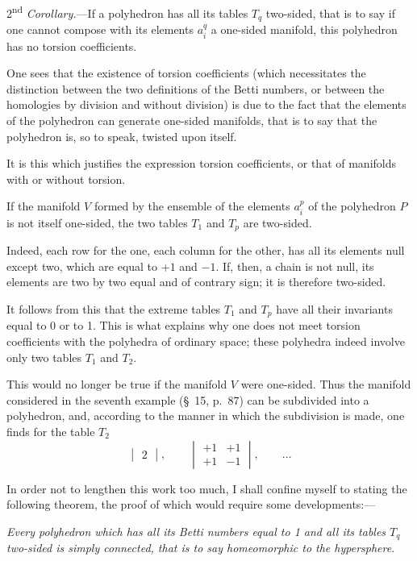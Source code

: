 \documentclass{article}
\begin{document}
2\textsuperscript{nd} \emph{Corollary.}---If a polyhedron has all its tables $T_{q}$ two-sided, that is to say if one cannot compose with its elements $a^{q}_{i}$ a one-sided manifold, this polyhedron has no torsion coefficients.

One sees that the existence of torsion coefficients (which necessitates the distinction between the two definitions of the Betti numbers, or between the homologies by division and without division) is due to the fact that the elements of the polyhedron can generate one-sided manifolds, that is to say that the polyhedron is, so to speak, twisted upon itself.

It is this which justifies the expression torsion coefficients, or that of manifolds with or without torsion.

If the manifold $V$ formed by the ensemble of the elements $a^{p}_{i}$ of the polyhedron $P$ is not itself one-sided, the two tables $T_{1}$ and $T_{p}$ are two-sided.

Indeed, each row for the one, each column for the other, has all its elements null except two, which are equal to $+1$ and $-1$. If, then, a chain is not null, its elements are two by two equal and of contrary sign; it is therefore two-sided.

It follows from this that the extreme tables $T_{1}$ and $T_{p}$ have all their invariants equal to 0 or to 1. This is what explains why one does not meet torsion coefficients with the polyhedra of ordinary space; these polyhedra indeed involve only two tables $T_{1}$ and $T_{2}$.

This would no longer be true if the manifold $V$ were one-sided. Thus the manifold considered in the seventh example (\S~15, p.\ 87) can be subdivided into a polyhedron, and, according to the manner in which the subdivision is made, one finds for the table $T_{2}$
\[ \begin{vmatrix} 2 \end{vmatrix}, \qquad \begin{vmatrix} +1 & +1 \\[1ex] +1 & -1 \end{vmatrix}, \qquad \ldots \]

In order not to lengthen this work too much, I shall confine myself to stating the following theorem, the proof of which would require some developments:---

\emph{Every polyhedron which has all its Betti numbers equal to 1 and all its tables $T_{q}$ two-sided is simply connected, that is to say homeomorphic to the hypersphere}.
\end{document}

